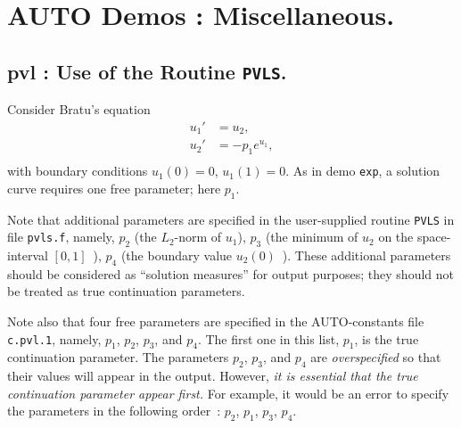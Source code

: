 \documentclass[12pt]{report}
\begin{document}
\chapter{ {\cal AUTO} Demos : Miscellaneous.} \label{ch:Demos_Misc}

\newpage
\section{ pvl : Use of the Routine {\tt PVLS}.} \label{sec:Demos_pvl}

Consider Bratu's equation
\begin{equation} \begin{array}{cl}
  u_1 ' &= u_2  ,  \\
  u_2 ' &= -p_1  e^{u_1} , \\ 
\end{array} \end{equation}
with boundary conditions $ u_1(0)=0$, $u_1(1)=0.$
As in demo {\tt exp}, a solution curve requires one free parameter;
here $p_1$.

Note that additional parameters are specified in the user-supplied routine 
{\tt PVLS} in file {\tt pvls.f}, namely,
$p_2$ (the $L_2$-norm of $u_1$),
$p_3$ (the minimum of $u_2$ on the space-interval $[0,1]$~),
$p_4$ (the boundary value $u_2(0)$~).
These additional parameters should be considered as ``solution measures''
for output purposes; they should not be treated as true
continuation parameters.

Note also that four free parameters are specified in the {\cal AUTO}-constants file 
{\tt c.pvl.1}, namely, $p_1$, $p_2$, $p_3$, and $p_4$.
The first one in this list, $p_1$, is the true continuation parameter. 
The parameters $p_2$, $p_3$, and $p_4$ are {\it overspecified}
so that their values will appear in the output.
However, 
{\it it is essential that the true continuation parameter appear first.}
For example, it would be an error to specify the parameters
in the following order~: $p_2$, $p_1$, $p_3$, $p_4$.
\end{document}
